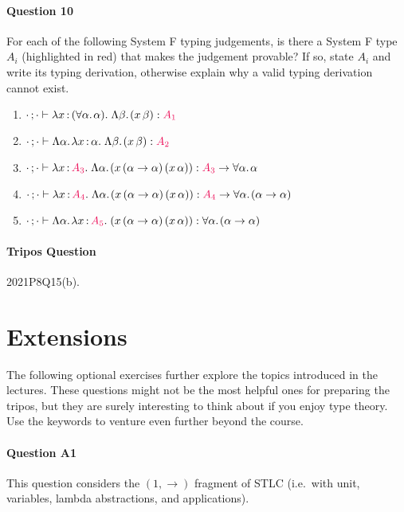 \documentclass[11pt,a4paper,twoside]{article}
\begin{document}
\paragraph{Question 10} For each of the following System F typing judgements, is there a System F type $A_i$ (highlighted in red) that makes the judgement provable? If so, state $A_i$ and write its typing derivation, otherwise explain why a valid typing derivation cannot exist.
\begin{enumerate}[label=(\alph*)]
  \item $\newcon \vdash \lam{x}{(\fora{\alpha}{\alpha})}{\Lam{\beta}{(\app{x}{\beta})}} : {\color{OrangeRed}{A_1}}$
  \item $\newcon \vdash \Lam{\alpha}{\lam{x}{\alpha}{\Lam{\beta}{(\app{x}{\beta})}}} : {\color{OrangeRed}{A_2}}$
  \item $\newcon \vdash \lam{x}{{\color{OrangeRed}{A_3}}}{\Lam{\alpha}{(\app{\app{x}{(\alpha \to \alpha)}}{(\app{x}{\alpha})})}} : {\color{OrangeRed}{A_3}} \to \fora{\alpha}{\alpha}$
  \item $\newcon \vdash \lam{x}{{\color{OrangeRed}{A_4}}}{\Lam{\alpha}{(\app{\app{x}{(\alpha \to \alpha)}}{(\app{x}{\alpha})})}} : {\color{OrangeRed}{A_4}} \to \fora{\alpha}{(\alpha \to \alpha)}$
  \item $\newcon \vdash \Lam{\alpha}{\lam{x}{{\color{OrangeRed}{A_5}}}{(\app{\app{x}{(\alpha \to \alpha)}}{(\app{x}{\alpha})})}} : \fora{\alpha}{(\alpha \to \alpha)}$
\end{enumerate}

\paragraph{Tripos Question} 2021P8Q15(b).

\section*{Extensions}

The following optional exercises further explore the topics introduced in the lectures. These questions might not be the most helpful ones for preparing the tripos, but they are surely interesting to think about if you enjoy type theory. Use the keywords to venture even further beyond the course.

\paragraph{Question A1} This question considers the $(1, \to)$ fragment of STLC (i.e.~with unit, variables, lambda abstractions, and applications). 
\end{document}
